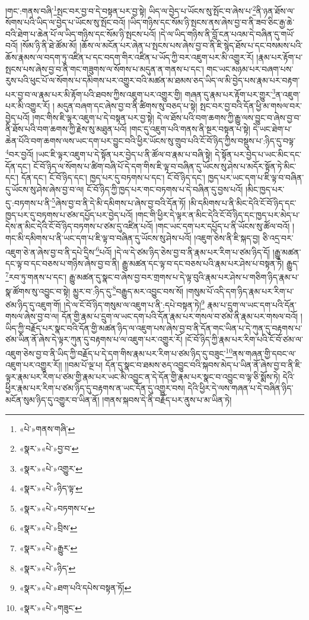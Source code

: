 །གང་:གནས་བཞི་\footnote{«པེ་»གནས་གཞི་}སྤང་བར་བྱ་བ་དེ་བསྟན་པར་བྱ་སྟེ། ཡིད་ལ་བྱེད་པ་ཡོངས་སུ་སྤོང་བ་ཞེས་པ་\footnote{«སྣར་»«པེ་»བྱ་བ་}ནི་ཉན་ཐོས་ལ་སོགས་པའི་ཡིད་ལ་བྱེད་པ་ཡོངས་སུ་སྤོང་བའོ། །ཡིད་གཉིས་དང་སོམ་ཉི་སྤངས་ནས་ཞེས་བྱ་བ་ནི་ཟབ་ཅིང་རྒྱ་ཆེ་བའི་ཐེག་པ་ཆེན་པོ་ལ་ཡིད་གཉིས་དང་སོམ་ཉི་སྤངས་པའོ། །དེ་ལ་ཡིད་གཉིས་ནི་བློ་ངན་པའམ་དེ་བཞིན་དུ་གཡོ་བའོ། །སོམ་ཉི་ནི་ཐེ་ཚོམ་མོ། །ཆོས་ལ་མངོན་པར་ཞེན་པ་སྤངས་པས་ཞེས་བྱ་བ་ནི་ཇི་སྙེད་ཐོས་པ་དང་བསམས་པའི་ཆོས་རྣམས་ལ་བདག་ཏུ་འཛིན་པ་དང་བདག་གིར་འཛིན་པ་ཡོད་ཀྱི་བར་འཇུག་པར་མི་འགྱུར་རོ། །རྣམ་པར་རྟོག་པ་སྤངས་པས་ཞེས་བྱ་བ་ནི་གང་གཟུགས་ལ་སོགས་པ་མདུན་ན་གནས་པ་དང་། གང་ཡང་མཉམ་པར་བཞག་པས་རུས་པའི་ཕུང་པོ་ལ་སོགས་པ་དམིགས་པར་འགྱུར་བའི་མཚན་མ་ཐམས་ཅད་ཡིད་ལ་མི་བྱེད་པས་རྣམ་པར་བརྟག་པར་བྱ་བ་ལ་རྣམ་པར་མི་རྟོག་པའི་ཐབས་ཀྱིས་འཇུག་པར་འགྱུར་གྱི། གཞན་དུ་རྣམ་པར་རྟོག་པར་གྱུར་\footnote{«སྣར་»«པེ་»འགྱུར་}ན་འཇུག་པར་མི་འགྱུར་རོ། །
མདུན་བཞག་དང་ཞེས་བྱ་བ་ནི་ཚིགས་སུ་བཅད་པ་སྟེ། སྤང་བར་བྱ་བའི་དོན་ཕྱི་མ་གསལ་བར་བྱེད་པའོ། །གང་གིས་ཇི་ལྟར་འཇུག་པ་དེ་བསྟན་པར་བྱ་སྟེ། དེ་ལ་ཐོས་པའི་བག་ཆགས་ཀྱི་རྒྱུ་ལས་བྱུང་བ་ཞེས་བྱ་བ་ནི་ཐོས་པའི་བག་ཆགས་ཀྱི་རྗེས་སུ་མཐུན་པའོ། །གང་དུ་འཇུག་པའི་གནས་ནི་སྔར་བསྟན་པ་སྟེ། དེ་ཡང་ཐེག་པ་ཆེན་པོའི་བག་ཆགས་ལས་ཡང་དག་པར་བྱུང་བའི་ཕྱིར་ཡོངས་སུ་གྲུབ་པའི་ངོ་བོ་ཉིད་ཀྱིས་བསྡུས་པ་:ཉིད་དུ་བལྟ་\footnote{«སྣར་»«པེ་»ཉིད་ལྟ་}བར་བྱའོ། །ཡང་ཇི་ལྟར་འཇུག་པ་དེ་སྟོན་པར་བྱེད་པ་ནི་ཚོལ་བ་རྣམ་པ་བཞི་སྟེ། དེ་སྟོན་པར་བྱེད་པ་ཡང་མིང་དང་དོན་དང་། ངོ་བོ་ཉིད་ལ་སོགས་པ་ཚིག་བཞི་པོ་དེ་དག་གིས་ཇི་ལྟ་བ་བཞིན་དུ་ཡོངས་སུ་ཤེས་པ་མདོར་སྟོན་ཏེ་མིང་དང་། དོན་དང་། ངོ་བོ་ཉིད་དང་། ཁྱད་པར་དུ་བཏགས་པ་དང་། ངོ་བོ་ཉིད་དང་། ཁྱད་པར་ཡང་དག་པ་ཇི་ལྟ་བ་བཞིན་དུ་ཡོངས་སུ་ཤེས་ཞེས་བྱ་བ་ལ། ངོ་བོ་ཉིད་ཀྱི་ཁྱད་པར་གང་བཏགས་པ་དེ་བཞིན་དུ་བྱས་པའོ། །མིང་ཁྱད་པར་དུ་:བཏགས་པ་ནི་\footnote{«སྣར་»«པེ་»བཏགས་པ་}ཞེས་བྱ་བ་ནི་དེ་མི་དམིགས་པ་ཞེས་བྱ་བའི་དོན་ཏོ། །མི་དམིགས་པ་ནི་མིང་དེའི་ངོ་བོ་ཉིད་དང་ཁྱད་པར་དུ་བཏགས་པ་ཙམ་དཔྱོད་པར་བྱེད་པའོ། །གང་གི་ཕྱིར་དེ་ལྟར་ན་མིང་དེའི་ངོ་བོ་ཉིད་དང་ཁྱད་པར་མེད་པ་དེས་ན་མིང་དེའི་ངོ་བོ་ཉིད་བཏགས་པ་ཙམ་དུ་འཛིན་པའོ། །གང་ཡང་དག་པར་དཔྱོད་པ་ནི་ཡོངས་སུ་ཚོལ་བའོ། །གང་མི་དམིགས་པ་ནི་ཡང་དག་པ་ཇི་ལྟ་བ་བཞིན་དུ་ཡོངས་སུ་ཤེས་པའོ། །འཇུག་ཅེས་ནི་ཇི་སྐད་བྱ། ཅི་འདྲ་བར་འཇུག་ཅེ་ན་ཞེས་བྱ་བ་ནི་དཔེ་དྲིས་\footnote{«སྣར་»«པེ་»བྲིས་}པའོ། །དེ་ལ་དེ་ཙམ་ཉིད་ཅེས་བྱ་བ་ནི་རྣམ་པར་རིག་པ་ཙམ་ཉིད་དོ། །རྒྱུ་མཚན་དང་ལྟ་བ་དང་བཅས་པ་གཉིས་ཞེས་བྱ་བ་ནི། རྒྱུ་མཚན་དང་ལྟ་བ་དང་བཅས་པའི་རྣམ་པར་ཤེས་པ་བསྟན་ཏེ། རྒྱུད་\footnote{«སྣར་»«པེ་»རྒྱུར་}རབ་ཏུ་གནས་པ་དང་། རྒྱུ་མཚན་དུ་སྣང་བ་ཞེས་བྱ་བར་གྲགས་པ་དེ་ལྟ་བུའི་རྣམ་པར་ཤེས་པ་གཅིག་ཉིད་རྣམ་པ་སྣ་ཚོགས་སུ་འབྱུང་བ་སྟེ། མྱུར་བ་:ཉིད་དུ་\footnote{«སྣར་»«པེ་»ཉིད་}བརྒྱུད་མར་འབྱུང་བས་སོ། །གསུམ་པོ་འདི་དག་ཉིད་རྣམ་པར་རིག་པ་ཙམ་ཉིད་དུ་འཇུག་གོ། །དེ་ལ་ངོ་བོ་ཉིད་གསུམ་ལ་འཇུག་པ་ནི་:དཔེ་བསྟན་ཏེ།\footnote{«སྣར་»«པེ་»ཐག་པའི་དཔེས་བསྟན་ཏོ།} རྣམ་པ་དྲུག་ལ་ཡང་དག་པའི་དོན་གསལ་ཞེས་བྱ་བ་ལ། དོན་གྱི་རྣམ་པ་དྲུག་ལ་ཡང་དག་པའི་དོན་རྣམ་པར་གསལ་བ་ཙམ་ནི་རྣམ་པར་གསལ་བའོ། །ཡིད་ཀྱི་བརྗོད་པར་སྣང་བའི་དོན་གྱི་མཚན་ཉིད་ལ་འཇུག་པས་ཞེས་བྱ་བ་ནི་དོན་གང་ཡིན་པ་དེ་ཀུན་དུ་བརྟགས་པ་ཙམ་ཡིན་ནོ་ཞེས་དེ་ལྟར་ཀུན་དུ་བརྟགས་པ་ལ་འཇུག་པར་འགྱུར་རོ། །ངོ་བོ་ཉིད་ཀྱི་རྣམ་པར་རིག་པའི་ངོ་བོ་ཙམ་ལ་འཇུག་ཅེས་བྱ་བ་ནི་ཡིད་ཀྱི་བརྗོད་པ་དེ་དག་གིས་རྣམ་པར་རིག་པ་ཙམ་ཉིད་དུ་བཟུང་\footnote{«སྣར་»«པེ་»གཟུང་}ནས་གཞན་གྱི་དབང་ལ་འཇུག་པར་འགྱུར་རོ།། །།བམ་པོ་ལྔ་པ། དོན་དུ་སྣང་བ་ཐམས་ཅད་འབྱུང་བའི་སྐབས་མེད་པ་ཡིན་ནོ་ཞེས་བྱ་བ་ནི་ཇི་ལྟར་རྣམ་པར་རིག་པ་ཙམ་གྱི་རྣམ་པར་ཡང་མི་འབྱུང་ན་དེ་དོན་གྱི་རྣམ་པར་སྣང་བ་འབྱུང་བ་ལྟ་ཅི་སྨོས་ཏེ། དེའི་ཕྱིར་རྣམ་པར་རིག་པ་ཙམ་ཉིད་དུ་བརྟགས་ན་ཡང་དོན་དུ་འགྱུར་བས། དེའི་ཕྱིར་དེ་ལས་གཞན་པ་དེ་བཞིན་ཉིད་མངོན་སུམ་ཉིད་དུ་འགྱུར་བ་ཡིན་ནོ། །གནས་སྐབས་དེ་ནི་བརྗོད་པར་ནུས་པ་མ་ཡིན་ཏེ། 